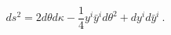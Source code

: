 \begin{equation}
 d s^2 = 2 d \theta d \kappa - \frac{1}{4} y^i \bar y^i d \theta^2 +
 d y^i d \bar y^i~.
\end{equation}

